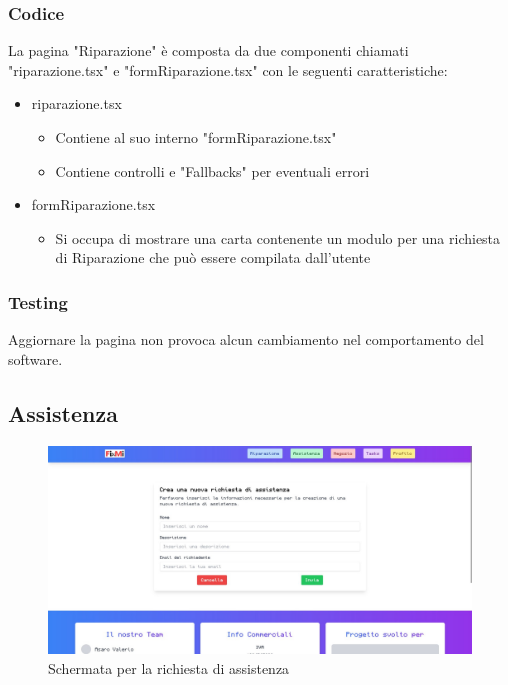 \documentclass{report}
\begin{document}
\subsubsection*{Codice}
La pagina "Riparazione" è composta da due componenti chiamati "riparazione.tsx" e "formRiparazione.tsx" con le seguenti caratteristiche:
\begin{itemize}
	\item riparazione.tsx
	\begin{itemize}
		\item Contiene al suo interno "formRiparazione.tsx"
		\item Contiene controlli e "Fallbacks" per eventuali errori
	\end{itemize}
	\item formRiparazione.tsx
	\begin{itemize}
		\item Si occupa di mostrare una carta contenente un modulo per una richiesta di Riparazione che può essere compilata dall'utente
	\end{itemize}
\end{itemize}

\subsubsection*{Testing}
Aggiornare la pagina non provoca alcun cambiamento nel comportamento del software.


\subsection{Assistenza}

\begin{figure}[H]
	\centering\includegraphics[width=1\textwidth]{images/microservizio-home/frontend/assistenza.jpg}
	\caption{Schermata per la richiesta di assistenza}
\end{figure}
\end{document}
